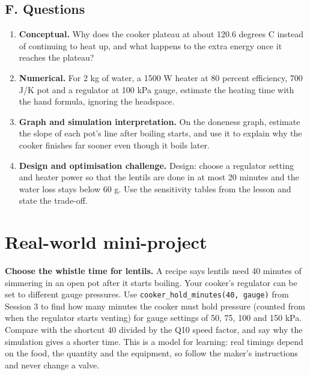 \documentclass[11pt,a4paper]{article}
\begin{document}
\subsection*{F. Questions}
\begin{enumerate}[nosep]
\item \textbf{Conceptual.} Why does the cooker plateau at about 120.6 degrees C instead of continuing to heat up, and what happens to the extra energy once it reaches the plateau?
\item \textbf{Numerical.} For 2 kg of water, a 1500 W heater at 80 percent efficiency, 700 J/K pot and a regulator at 100 kPa gauge, estimate the heating time with the hand formula, ignoring the headspace.
\item \textbf{Graph and simulation interpretation.} On the doneness graph, estimate the slope of each pot's line after boiling starts, and use it to explain why the cooker finishes far sooner even though it boils later.
\item \textbf{Design and optimisation challenge.} Design: choose a regulator setting and heater power so that the lentils are done in at most 20 minutes and the water loss stays below 60 g. Use the sensitivity tables from the lesson and state the trade-off.
\end{enumerate}

\section{Real-world mini-project}
\textbf{Choose the whistle time for lentils.} A recipe says lentils need 40 minutes of simmering in an open pot after it starts boiling. Your cooker's regulator can be set to different gauge pressures. Use \texttt{cooker\_hold\_minutes(40, gauge)} from Session 3 to find how many minutes the cooker must hold pressure (counted from when the regulator starts venting) for gauge settings of 50, 75, 100 and 150 kPa. Compare with the shortcut 40 divided by the Q10 speed factor, and say why the simulation gives a shorter time. This is a model for learning: real timings depend on the food, the quantity and the equipment, so follow the maker's instructions and never change a valve.
\end{document}

